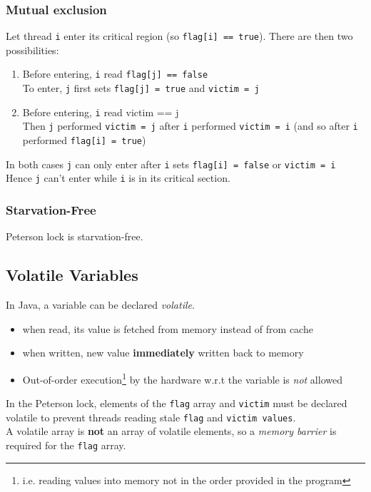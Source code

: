 \documentclass{article}
\begin{document}
\subsubsection{Mutual exclusion}
Let thread \verb|i| enter its critical region (so \verb|flag[i] == true|).
\bigbreak There are then two possibilities:
\begin{enumerate}
    \item Before entering, \verb|i| read \verb|flag[j] == false|
    \\To enter, \verb|j| first sets \verb|flag[j] = true| and \verb|victim = j|
    \item Before entering, \verb|i| read victim == j
    \\Then \verb|j| performed \verb|victim = j| after \verb|i| performed \verb|victim = i| (and so after \verb|i| performed \verb|flag[i] = true|)
\end{enumerate}
In both cases \verb|j| can only enter after \verb|i| sets \verb|flag[i] = false| or \verb|victim = i|
\\Hence \verb|j| can't enter while \verb|i| is in its critical section.

\subsubsection{Starvation-Free}
Peterson lock is starvation-free.


\subsection{Volatile Variables}
In Java, a variable can be declared \textit{volatile}.
\begin{itemize}
    \item when read, its value is fetched from memory instead of from cache
    \item when written, new value \textbf{immediately} written back to memory
    \item Out-of-order execution\footnote{i.e. reading values into memory not in the order provided in the program} by the hardware w.r.t the variable is \textit{not} allowed
\end{itemize}
In the Peterson lock, elements of the \verb|flag| array and \verb|victim| must be declared volatile to prevent threads reading stale \verb|flag| and \verb|victim values|.
\\A volatile array is \textbf{not} an array of volatile elements, so a \textit{memory barrier} is required for the \verb|flag| array.
\end{document}
